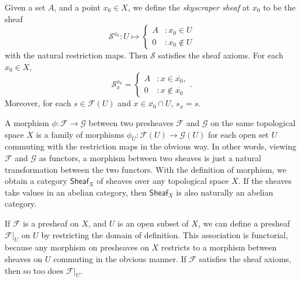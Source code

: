 \begin{example}
    Given a set $A$, and a point $x_0 \in X$, we define the \emph{skyscraper sheaf} at $x_0$ to be the sheaf
    \[ \mathcal{S}^{x_0}: U \mapsto \begin{cases} A &: x_0 \in U \\ 0 &: x_0 \not \in U \end{cases} \]
    with the natural restriction maps. Then $\mathcal{S}$ satisfies the sheaf axioms. For each $x_0 \in X$,
    \[ \mathcal{S}^{x_0}_x = \begin{cases} A &: x \in \overline{x_0}, \\ 0 &: x \not \in \overline{x_0} \end{cases}. \]
    Moreover, for each $s \in \mathcal{F}(U)$ and $x \in \overline{x_0} \cap U$, $s_x = s$.
\end{example}

A morphism $\phi: \mathcal{F} \to \mathcal{G}$ between two presheaves $\mathcal{F}$ and $\mathcal{G}$ on the same topological space $X$ is a family of morphisms $\phi_U: \mathcal{F}(U) \to \mathcal{G}(U)$ for each open set $U$ commuting with the restriction maps in the obvious way. In other words, viewing $\mathcal{F}$ and $\mathcal{G}$ as functors, a morphism between two sheaves is just a natural transformation between the two functors. With the definition of morphism, we obtain a category $\mathsf{Sheaf}_X$ of sheaves over any topological space $X$. If the sheaves take values in an abelian category, then $\mathsf{Sheaf}_X$ is also naturally an abelian category.

\begin{example}
    If $\mathcal{F}$ is a presheaf on $X$, and $U$ is an open subset of $X$, we can define a presheaf $\mathcal{F}|_U$ on $U$ by restricting the domain of definition. This association is functorial, because any morphism on presheaves on $X$ restricts to a morphism between sheaves on $U$ commuting in the obvious manner. If $\mathcal{F}$ satisfies the sheaf axioms, then so too does $\mathcal{F}|_U$.
\end{example}

